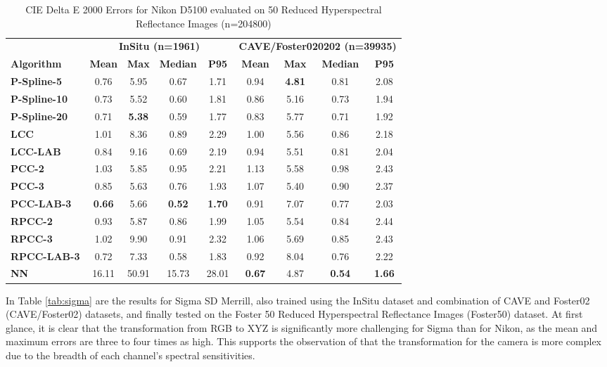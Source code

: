  \begin{table}[htbp]
  \centering
  \caption{CIE Delta E 2000 Errors for Nikon D5100 evaluated on 50 Reduced Hyperspectral Reflectance Images (n=204800)}
    \begin{tabular}{>{\bfseries}l@{\hspace{3mm}}cccc|cccc}
        \midrule
            & \multicolumn{4}{c}{\textbf{InSitu (n=1961)}} & \multicolumn{4}{c}{\textbf{CAVE/Foster020202 (n=39935)}} \\
        \cmidrule(lr){2-5} \cmidrule(lr){6-9}
            \textbf{Algorithm} & \textbf{Mean} & \textbf{Max}  & \textbf{Median} & \textbf{P95} & \textbf{Mean} & \textbf{Max}  & \textbf{Median} &  \textbf{P95} \\
        \midrule
            P-Spline-5 & 0.76 & 5.95 & 0.67 & 1.71 & 0.94 & \textbf{4.81}  & 0.81 & 2.08 \\
            P-Spline-10 & 0.73 & 5.52 & 0.60 & 1.81 & 0.86 & 5.16 & 0.73 & 1.94 \\
            P-Spline-20 & 0.71 & \textbf{5.38} &  0.59 & 1.77 & 0.83 & 5.77 & 0.71 & 1.92 \\
            LCC & 1.01 & 8.36 & 0.89 &  2.29 & 1.00 & 5.56 & 0.86 & 2.18 \\
            LCC-LAB & 0.84 & 9.16 & 0.69 &  2.19 & 0.94 & 5.51 & 0.81 & 2.04 \\
            PCC-2 & 1.03 & 5.85 & 0.95 & 2.21 & 1.13 & 5.58 & 0.98 & 2.43 \\
            PCC-3 & 0.85 & 5.63 & 0.76 & 1.93 & 1.07 & 5.40 & 0.90 &  2.37 \\
            PCC-LAB-3 & \textbf{0.66} & 5.66 & \textbf{0.52} &  \textbf{1.70} & 0.91 & 7.07 & 0.77 &  2.03 \\
            RPCC-2 & 0.93 & 5.87 & 0.86 & 1.99 & 1.05 & 5.54 & 0.84 & 2.44 \\
            RPCC-3 & 1.02 & 9.90 &  0.91 & 2.32 & 1.06 & 5.69 & 0.85 & 2.43 \\
            RPCC-LAB-3 & 0.72 & 7.33 & 0.58 & 1.83 & 0.92 & 8.04 & 0.76 & 2.22 \\
            NN & 16.11 & 50.91 & 15.73 & 28.01 & \textbf{0.67} & 4.87 & \textbf{0.54} & \textbf{1.66} \\
        \bottomrule
    \end{tabular}
  \label{tab:nikon}
\end{table}

In Table \ref{tab:sigma} are the results for Sigma SD Merrill, also trained using the InSitu dataset and combination of CAVE and Foster02 (CAVE/Foster02) datasets, and finally tested on the Foster 50 Reduced Hyperspectral Reflectance Images (Foster50) dataset. At first glance, it is clear that the transformation from RGB to XYZ is significantly more challenging for Sigma than for Nikon, as the mean and maximum errors are three to four times as high. This supports the observation of \citeauthor{finlayson2015color} that the transformation for the camera is more complex due to the breadth of each channel's spectral sensitivities.

